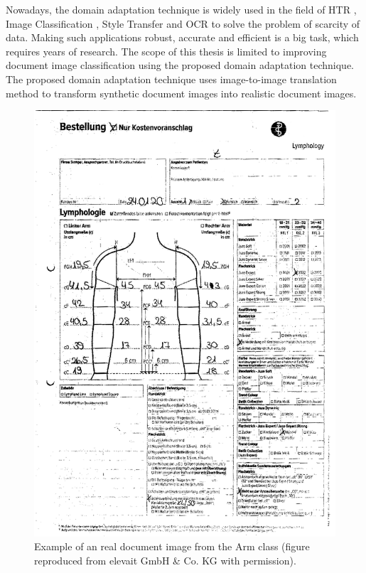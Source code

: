 Nowadays, the domain adaptation technique is widely used in the field of \ac{HTR} \cite{Kang_2020}, Image Classification \cite{5288526}, Style Transfer \cite{johnson2016perceptual} and \ac{OCR} \cite{8978011} to solve the problem of scarcity of data. Making such applications robust, accurate and efficient is a big task, which requires years of research. The scope of this thesis is limited to improving document image classification using the proposed domain adaptation technique. The proposed domain adaptation technique uses image-to-image translation method to transform synthetic document images into realistic document images.


\begin{figure}[H]
        \begin{center}
	   	\includegraphics[scale=0.22]{images/Introduction/ArmRealImage.png}
    		\caption[Example of an real document image from the Arm class.]{Example of an real document image from the Arm class (figure reproduced from elevait GmbH \& Co. KG with permission). }
    		\label{fig:realImageArm}
	    \end{center}
\end{figure}





